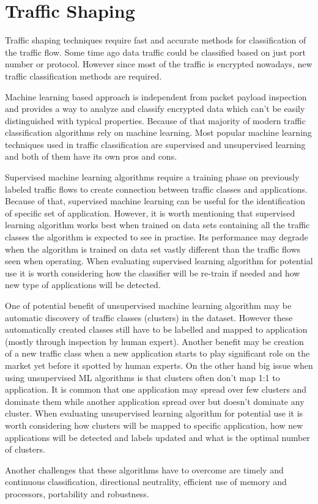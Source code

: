 \documentclass[conference]{IEEEtran}
\begin{document}
\section{Traffic Shaping}
Traffic shaping techniques require fast and accurate methods for classification of the traffic flow. Some time ago data traffic could be classified based on just port number or protocol. However since most of the traffic is encrypted nowadays, new traffic classification methods are required\cite{shaping1}\cite{shaping2}.\par
Machine learning based approach is independent from packet payload inspection and provides a way to analyze and classify encrypted data which can't be easily distinguished with typical properties. Because of that majority of modern traffic classification algorithms rely on machine learning. Most popular machine learning techniques used in traffic classification are supervised\cite{shaping1} and unsupervised\cite{shaping3} learning and both of them have its own pros and cons\cite{shaping2}.\par
Supervised machine learning algorithms require a training phase on previously labeled traffic flows to create connection between traffic classes and applications. Because of that, supervised machine learning can be useful for the identification of specific set of application. However, it is worth mentioning that supervised learning algorithm works best when trained on data sets containing all the traffic classes the algorithm is expected to see in practise. Its performance may degrade when the algorithm is trained on data set vastly different than the traffic flows seen when operating. When evaluating supervised learning algorithm for potential use it is worth considering how the classifier will be re-train if needed and how new type of applications will be detected\cite{shaping2}.\par
One of potential benefit of unsupervised machine learning algorithm may be automatic discovery of traffic classes (clusters) in the dataset. However these automatically created classes still have to be labelled and mapped to application (mostly through inspection by human expert). Another benefit may be creation of a new traffic class when a new application starts to play significant role on the market yet before it spotted by human experts. On the other hand big issue when using unsupervised ML algorithms is that clusters often don't map 1:1 to application. It is common that one application may spread over few clusters and dominate them while another application spread over but doesn't dominate any cluster. When evaluating unsupervised learning algorithm for potential use it is worth considering how clusters will be mapped to specific application, how new applications will be detected and labels updated and what is the optimal number of clusters\cite{shaping2}.\par
Another challenges that these algorithms have to overcome are timely and continuous classification, directional neutrality, efficient use of memory and processors, portability and robustness.\par
\end{document}

